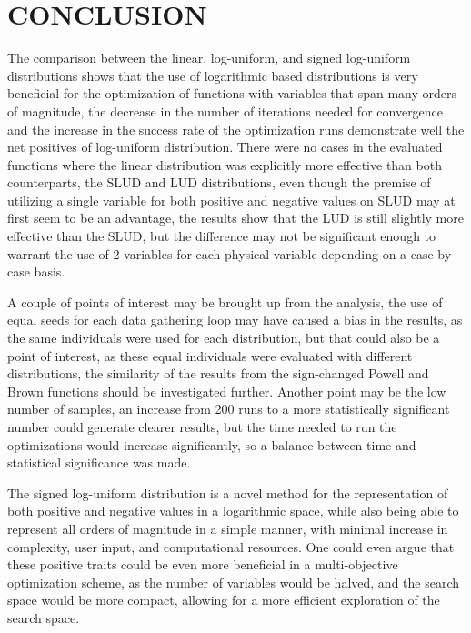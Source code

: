 \documentclass[10pt,fleqn,a4paper,twoside]{article}
\begin{document}
\section{CONCLUSION}

The comparison between the linear, log-uniform, and signed log-uniform distributions shows that the use of logarithmic based distributions is very beneficial for the optimization of functions with variables that span many orders of magnitude, 
the decrease in the number of iterations needed for convergence and the increase in the success rate of the optimization runs demonstrate well the net positives of log-uniform distribution.
There were no cases in the evaluated functions where the linear distribution was explicitly more effective than both counterparts, the SLUD and LUD distributions, even though the premise of utilizing a single
variable for both positive and negative values on SLUD may at first seem to be an advantage, the results show that the LUD is still slightly more effective than the SLUD, but the difference
may not be significant enough to warrant the use of 2 variables for each physical variable depending on a case by case basis.

A couple of points of interest may be brought up from the analysis, the use of equal seeds for each data gathering loop may have caused a bias in the results, as the same individuals were used for each distribution,
but that could also be a point of interest, as these equal individuals were evaluated with different distributions, the similarity of the results from the sign-changed Powell and Brown functions should be investigated further. Another point may be the low number of samples, an increase from 200 runs to a more statistically significant number could
generate clearer results, but the time needed to run the optimizations would increase significantly, so a balance between time and statistical significance was made. 

The signed log-uniform distribution is a novel method for the representation of both positive and negative values in a logarithmic space, while also being able to represent all orders of magnitude in a
simple manner, with minimal increase in complexity, user input, and computational resources. One could even argue that these positive traits could be even more beneficial in a multi-objective optimization scheme, as the number of variables would be halved, and the search space would be more compact, allowing for a more efficient exploration of the search space.
\end{document}
